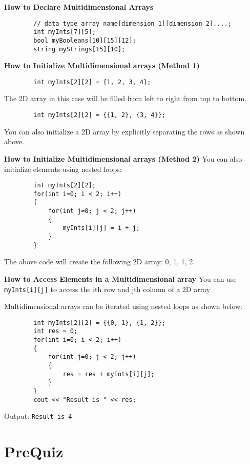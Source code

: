 \textbf{How to Declare Multidimensional Arrays}

\begin{verbatim}
        // data_type array_name[dimension_1][dimension_2]....;
        int myInts[7][5];
        bool myBooleans[10][15][12];
        string myStrings[15][10];
\end{verbatim}

\textbf{How to Initialize Multidimensional arrays (Method 1)}

\begin{verbatim}
        int myInts[2][2] = {1, 2, 3, 4};
\end{verbatim}

The 2D array in this case will be filled from left to right from top to bottom.

\begin{verbatim}
        int myInts[2][2] = {{1, 2}, {3, 4}};
\end{verbatim}

You can also initialize a 2D array by explicitly separating the rows as shown above.

\textbf{How to Initialize Multidimensional arrays (Method 2)} You can also initialize elements using nested loops:

\begin{verbatim}
        int myInts[2][2];
        for(int i=0; i < 2; i++)
        {
            for(int j=0; j < 2; j++)
            {
                myInts[i][j] = i + j;
            }
        }
\end{verbatim}

The above code will create the following 2D array: {{0, 1}, {1, 2}}.

\textbf{How to Access Elements in a Multidimensional array}
You can use \texttt{myInts[i][j]} to access the ith row and jth column of a 2D array

Multidimensional arrays can be iterated using nested loops as shown below:

\begin{verbatim}
        int myInts[2][2] = {{0, 1}, {1, 2}};
        int res = 0;
        for(int i=0; i < 2; i++)
        {
            for(int j=0; j < 2; j++)
            {
                res = res + myInts[i][j];
            }
        }
        cout << "Result is " << res;
\end{verbatim}

Output: \texttt{Result is 4}

\section{PreQuiz}

